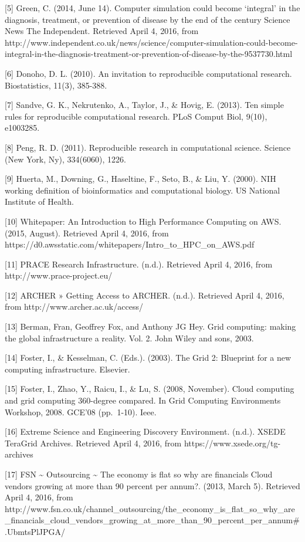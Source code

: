 \documentclass[]{article}
\begin{document}
{[}5{]} Green, C. (2014, June 14). Computer simulation could become
`integral' in the diagnosis, treatment, or prevention of disease by the
end of the century \textbar{} Science \textbar{} News \textbar{} The
Independent. Retrieved April 4, 2016, from
http://www.independent.co.uk/news/science/computer-simulation-could-become-integral-in-the-diagnosis-treatment-or-prevention-of-disease-by-the-9537730.html

{[}6{]} Donoho, D. L. (2010). An invitation to reproducible
computational research. Biostatistics, 11(3), 385-388.

{[}7{]} Sandve, G. K., Nekrutenko, A., Taylor, J., \& Hovig, E. (2013).
Ten simple rules for reproducible computational research. PLoS Comput
Biol, 9(10), e1003285.

{[}8{]} Peng, R. D. (2011). Reproducible research in computational
science. Science (New York, Ny), 334(6060), 1226.

{[}9{]} Huerta, M., Downing, G., Haseltine, F., Seto, B., \& Liu, Y.
(2000). NIH working definition of bioinformatics and computational
biology. US National Institute of Health.

{[}10{]} Whitepaper: An Introduction to High Performance Computing on
AWS. (2015, August). Retrieved April 4, 2016, from
https://d0.awsstatic.com/whitepapers/Intro\_to\_HPC\_on\_AWS.pdf

{[}11{]} PRACE Research Infrastructure. (n.d.). Retrieved April 4, 2016,
from http://www.prace-project.eu/

{[}12{]} ARCHER » Getting Access to ARCHER. (n.d.). Retrieved April 4,
2016, from http://www.archer.ac.uk/access/

{[}13{]} Berman, Fran, Geoffrey Fox, and Anthony JG Hey. Grid computing:
making the global infrastructure a reality. Vol. 2. John Wiley and sons,
2003.

{[}14{]} Foster, I., \& Kesselman, C. (Eds.). (2003). The Grid 2:
Blueprint for a new computing infrastructure. Elsevier.

{[}15{]} Foster, I., Zhao, Y., Raicu, I., \& Lu, S. (2008, November).
Cloud computing and grid computing 360-degree compared. In Grid
Computing Environments Workshop, 2008. GCE'08 (pp.~1-10). Ieee.

{[}16{]} Extreme Science and Engineering Discovery Environment. (n.d.).
XSEDE \textbar{} TeraGrid Archives. Retrieved April 4, 2016, from
https://www.xsede.org/tg-archives

{[}17{]} FSN \textasciitilde{} Outsourcing \textasciitilde{} The economy
is flat so why are financials Cloud vendors growing at more than 90
percent per annum?. (2013, March 5). Retrieved April 4, 2016, from
http://www.fsn.co.uk/channel\_outsourcing/the\_economy\_is\_flat\_so\_why\_are\_financials\_cloud\_vendors\_growing\_at\_more\_than\_90\_percent\_per\_annum\#.UbmtsPlJPGA/
\end{document}

